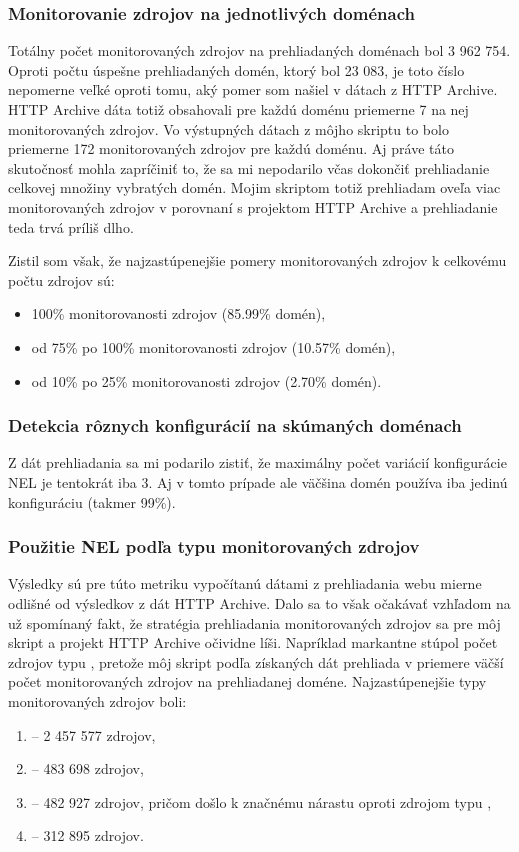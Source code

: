 \subsubsection{Monitorovanie zdrojov na jednotlivých doménach}

Totálny počet monitorovaných zdrojov na prehliadaných doménach bol 3 962 754.
Oproti počtu úspešne prehliadaných domén, ktorý bol 23 083, je toto číslo nepomerne veľké oproti tomu, aký pomer som našiel v dátach z HTTP Archive.
HTTP Archive dáta totiž obsahovali pre každú doménu priemerne 7 na nej monitorovaných zdrojov.
Vo výstupných dátach z môjho skriptu to bolo priemerne 172 monitorovaných zdrojov pre každú doménu.  
Aj práve táto skutočnosť mohla zapríčiniť to, že sa mi nepodarilo včas dokončiť prehliadanie celkovej množiny vybratých domén. 
Mojim skriptom totiž prehliadam oveľa viac monitorovaných zdrojov v porovnaní s projektom HTTP Archive a prehliadanie teda trvá príliš dlho.

Zistil som však, že najzastúpenejšie pomery monitorovaných zdrojov k celkovému počtu zdrojov sú:
\begin{itemize}
    \item 100\% monitorovanosti zdrojov (85.99\% domén),
    \item od 75\% po 100\% monitorovanosti zdrojov (10.57\% domén),
    \item od 10\% po 25\% monitorovanosti zdrojov (2.70\% domén).
\end{itemize}

\subsubsection{Detekcia rôznych konfigurácií na skúmaných doménach}

Z dát prehliadania sa mi podarilo zistiť, že maximálny počet variácií konfigurácie NEL je tentokrát iba 3.
Aj v tomto prípade ale väčšina domén používa iba jedinú konfiguráciu (takmer 99\%).

\subsubsection{Použitie NEL podľa typu monitorovaných zdrojov}

Výsledky sú pre túto metriku vypočítanú dátami z prehliadania webu mierne odlišné od výsledkov z dát HTTP Archive. 
Dalo sa to však očakávať vzhľadom na už spomínaný fakt, že stratégia prehliadania monitorovaných zdrojov sa pre môj skript a projekt HTTP Archive očividne líši.
Napríklad markantne stúpol počet zdrojov typu , pretože môj skript podľa získaných dát prehliada v priemere väčší počet monitorovaných zdrojov na prehliadanej doméne. 
Najzastúpenejšie typy monitorovaných zdrojov boli:
\begin{enumerate}
    \item {} -- 2 457 577 zdrojov,
    \item {} -- 483 698 zdrojov,
    \item {} -- 482 927 zdrojov, pričom došlo k značnému nárastu oproti zdrojom typu ,
    \item {} -- 312 895 zdrojov.
\end{enumerate}


